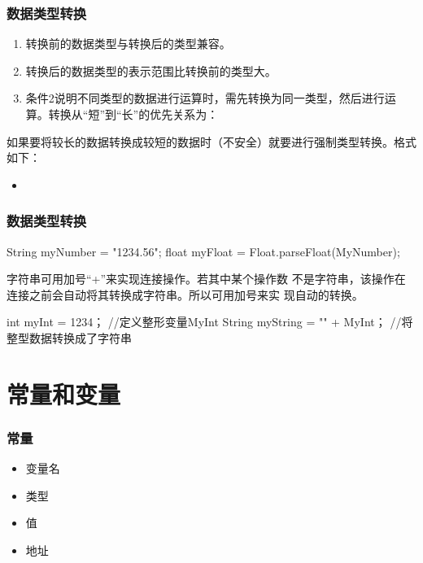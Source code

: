 \begin{frame}[fragile]
  \frametitle{数据类型转换}


  
  \begin{enumerate}
  \item 转换前的数据类型与转换后的类型兼容。
  \item 转换后的数据类型的表示范围比转换前的类型大。
  \item 条件2说明不同类型的数据进行运算时，需先转换为同一类型，然后进行运算。转换从“短”到“长”的优先关系为：\\
  \end{enumerate}


  如果要将较长的数据转换成较短的数据时（不安全）就要进行强制类型转换。格式如下：

  \begin{itemize}
  \item {}
  \end{itemize}
\end{frame}

\begin{frame}[fragile]
  \frametitle{数据类型转换}


  \begin{javaCode}
    String myNumber = "1234.56";
    float myFloat = Float.parseFloat(MyNumber);
  \end{javaCode}


  字符串可用加号“+”来实现连接操作。若其中某个操作数
  不是字符串，该操作在连接之前会自动将其转换成字符串。所以可用加号来实
  现自动的转换。

  \begin{javaCode}
    int myInt = 1234；               //定义整形变量MyInt
    String myString = "" + MyInt；    //将整型数据转换成了字符串 
  \end{javaCode}
\end{frame}

\section{常量和变量}

\begin{frame}[fragile]
  \frametitle{常量}
  \begin{itemize}
  \item 变量名
  \item 类型
  \item 值
  \item 地址
  \end{itemize}
\end{frame}

